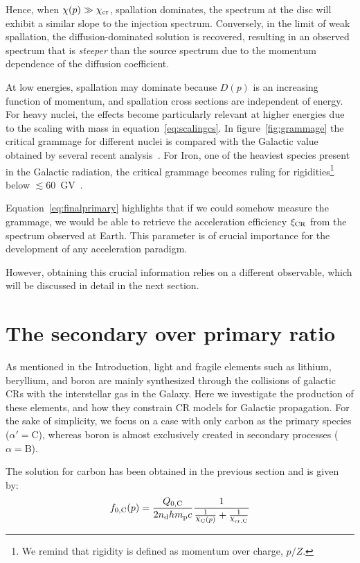 Hence, when $\chi(p)\gg \chi_{\rm cr}$, spallation dominates, the spectrum at the disc will exhibit a similar slope to the injection spectrum. Conversely, in the limit of weak spallation, the diffusion-dominated solution is recovered, resulting in an observed spectrum that is \emph{steeper} than the source spectrum due to the momentum dependence of the diffusion coefficient.

At low energies, spallation may dominate because $D(p)$ is an increasing function of momentum, and spallation cross sections are independent of energy. For heavy nuclei, the effects become particularly relevant at higher energies due to the scaling with mass in equation~\eqref{eq:scalingcs}. In figure~\ref{fig:grammage} the critical grammage for different nuclei is compared with the Galactic value obtained by several recent analysis~\cite{Evoli2019prd,Weinrich2020aa}. For Iron, one of the heaviest species present in the Galactic radiation, the critical grammage becomes ruling for rigidities\footnote{We remind that rigidity is defined as momentum over charge, $p/Z$.} below $\lesssim 60$~GV~\cite{Schroer2021prd}.

Equation~\eqref{eq:finalprimary} highlights that if we could somehow measure the grammage, we would be able to retrieve the acceleration efficiency $\xi_{\rm CR}$ from the spectrum observed at Earth. This parameter is of crucial importance for the development of any acceleration paradigm.

However, obtaining this crucial information relies on a different observable, which will be discussed in detail in the next section.

\section{The secondary over primary ratio}
\label{sec:secondaryoverprimary}

As mentioned in the Introduction, light and fragile elements such as lithium, beryllium, and boron are mainly synthesized through the collisions of galactic CRs with the interstellar gas in the Galaxy. Here we investigate the production of these elements, and how they constrain CR models for Galactic propagation. 
%
For the sake of simplicity, we focus on a case with only carbon as the primary species ($\alpha' = \text{C}$), whereas boron is almost exclusively created in secondary processes ($\alpha = \text{B}$).

The solution for carbon has been obtained in the previous section and is given by:
%
\begin{equation}
f_{0,\rm C}(p) = \frac{Q_{0,\rm C}}{2n_{\rm d}h m_{\rm p}c} \frac{1}{\frac{1}{\rchi_{\rm C}(p)} + \frac{1}{\rchi_{\rm cr, C}}}
\end{equation}

